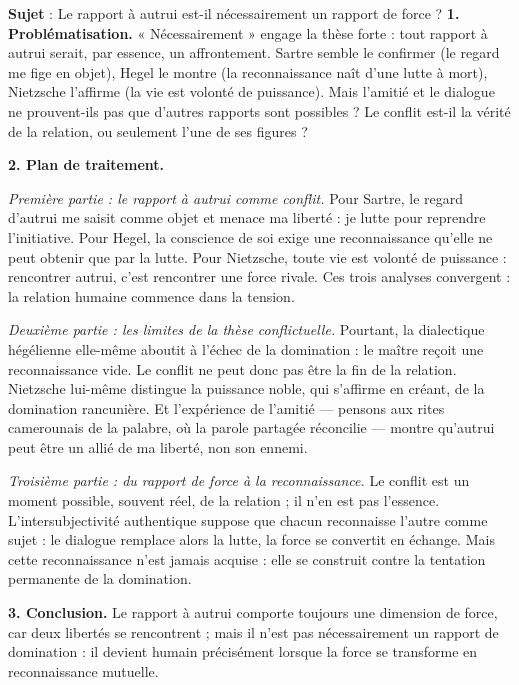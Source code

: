 \documentclass[11pt]{article}
\begin{document}
\begin{exoresolu}
\textbf{Sujet} : Le rapport à autrui est-il nécessairement un rapport de force ?
\tcblower
\textbf{1. Problématisation.} « Nécessairement » engage la thèse forte : tout rapport à autrui serait, par essence, un affrontement. Sartre semble le confirmer (le regard me fige en objet), Hegel le montre (la reconnaissance naît d'une lutte à mort), Nietzsche l'affirme (la vie est volonté de puissance). Mais l'amitié et le dialogue ne prouvent-ils pas que d'autres rapports sont possibles ? Le conflit est-il la vérité de la relation, ou seulement l'une de ses figures ?

\textbf{2. Plan de traitement.}

\emph{Première partie : le rapport à autrui comme conflit.} Pour Sartre, le regard d'autrui me saisit comme objet et menace ma liberté : je lutte pour reprendre l'initiative. Pour Hegel, la conscience de soi exige une reconnaissance qu'elle ne peut obtenir que par la lutte. Pour Nietzsche, toute vie est volonté de puissance : rencontrer autrui, c'est rencontrer une force rivale. Ces trois analyses convergent : la relation humaine commence dans la tension.

\emph{Deuxième partie : les limites de la thèse conflictuelle.} Pourtant, la dialectique hégélienne elle-même aboutit à l'échec de la domination : le maître reçoit une reconnaissance vide. Le conflit ne peut donc pas être la fin de la relation. Nietzsche lui-même distingue la puissance noble, qui s'affirme en créant, de la domination rancunière. Et l'expérience de l'amitié — pensons aux rites camerounais de la palabre, où la parole partagée réconcilie — montre qu'autrui peut être un allié de ma liberté, non son ennemi.

\emph{Troisième partie : du rapport de force à la reconnaissance.} Le conflit est un moment possible, souvent réel, de la relation ; il n'en est pas l'essence. L'intersubjectivité authentique suppose que chacun reconnaisse l'autre comme sujet : le dialogue remplace alors la lutte, la force se convertit en échange. Mais cette reconnaissance n'est jamais acquise : elle se construit contre la tentation permanente de la domination.

\textbf{3. Conclusion.} Le rapport à autrui comporte toujours une dimension de force, car deux libertés se rencontrent ; mais il n'est pas nécessairement un rapport de domination : il devient humain précisément lorsque la force se transforme en reconnaissance mutuelle.
\end{exoresolu}
\end{document}
